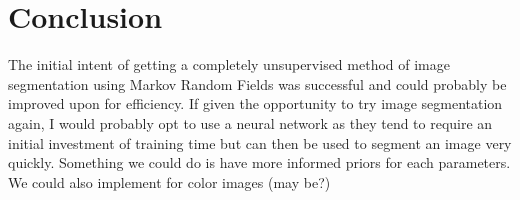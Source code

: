 \documentclass[11pt]{article}
\begin{document}
\section{Conclusion}
The initial intent of getting a completely unsupervised method of image segmentation using Markov Random Fields was successful and could probably be improved upon for efficiency. If given the opportunity to try image segmentation again, I would probably opt to use a neural network as they tend to require an initial investment of training time but can then be used to segment an image very quickly. Something we could do is have more informed priors for each parameters. We could also implement for color images (may be?)
\end{document}

